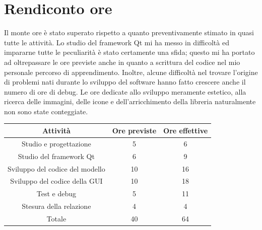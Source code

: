 \documentclass[10pt]{article}
\begin{document}
\section{Rendiconto ore}
Il monte ore è stato superato rispetto a quanto preventivamente stimato in quasi tutte le attività. Lo studio del framework Qt mi ha messo in difficoltà ed impararne tutte le peculiarità è stato certamente una sfida; questo mi ha portato ad oltrepassare le ore previste anche in quanto a scrittura del codice nel mio personale percorso di apprendimento. Inoltre, alcune difficoltà nel trovare l'origine di problemi nati durante lo sviluppo del software hanno fatto crescere anche il numero di ore di debug. Le ore dedicate allo sviluppo meramente estetico, alla ricerca delle immagini, delle icone e dell'arricchimento della libreria naturalmente non sono state conteggiate.
\begin{center}
    \begin{tabular}{| c | c | c |} \hline
    Attività & Ore previste & Ore effettive \\\hline
    Studio e progettazione & 5 & 6 \\
    Studio del framework Qt & 6 & 9 \\
    Sviluppo del codice del modello & 10 & 16 \\
    Sviluppo del codice della GUI & 10 & 18 \\
    Test e debug & 5 & 11 \\
    Stesura della relazione & 4 & 4 \\\hline
    Totale & 40 & 64 \\\hline
    \end{tabular}
\end{center}
\end{document}

